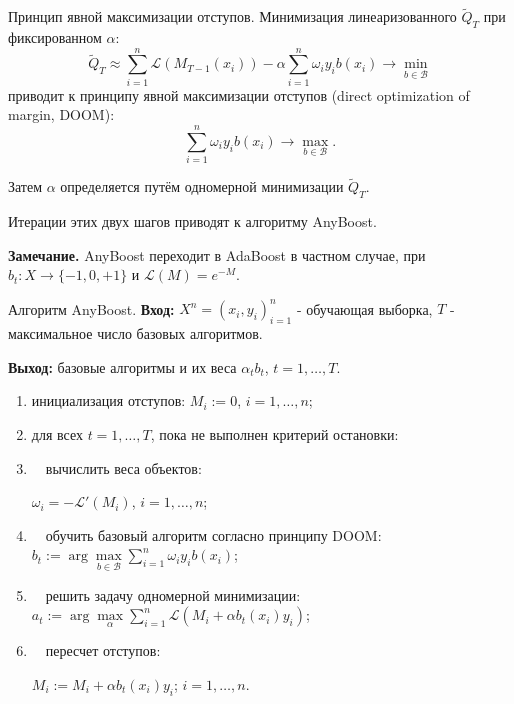 \documentclass[10pt,unicode,notheorems]{beamer}
\newcommand{\Laplace}{\mathscr{L}}
\begin{document}
\begin{frame}{Принцип явной максимизации отступов.}
Минимизация линеаризованного $\widetilde {Q}_T$ при фиксированном $\alpha$:
$$\widetilde {Q}_T \approx \sum_{i=1}^{n} \Laplace (M_{T-1}(x_i)) - \alpha \sum_{i=1}^{n} \omega_i y_i b(x_i) \to \min \limits_{b \in \mathcal{B}}$$
приводит к принципу явной максимизации отступов (direct optimization of margin, DOOM):
$$\sum_{i=1}^{n} \omega_i y_i b(x_i) \to \max \limits_{b \in \mathcal{B}}.$$

Затем $\alpha$ определяется путём одномерной минимизации $\widetilde {Q}_T$.
\vspace{0.2cm}

Итерации этих двух шагов приводят к алгоритму AnyBoost.
\vspace{0.2cm}

\textbf{Замечание.} AnyBoost переходит в AdaBoost в частном случае,
при $b_t: X \to \{-1, 0, +1\}$ и $\Laplace (M) = e^{-M}$.
\end{frame}

\begin{frame}{Алгоритм AnyBoost.}
\textbf{Вход:} $X^n = (x_i,y_i)_{i=1}^n$ - обучающая выборка, $T$ - максимальное число базовых алгоритмов.
\vspace{0.2cm}

\textbf{Выход:} базовые алгоритмы и их веса $\alpha_t b_t$, $t = 1, \ldots, T$.
\vspace{0.2cm}

\begin{enumerate}
\item инициализация отступов: $M_i := 0$, $i = 1, \ldots, n$;
\item для всех $t=1,\ldots,T$, пока не выполнен критерий остановки:
\item  $\quad$вычислить веса объектов:

$\omega_i = -\Laplace'(M_i)$, $i = 1, \ldots, n$;
\item   $\quad$обучить базовый алгоритм согласно принципу DOOM: 
$b_t := \arg \max \limits_{b \in \mathcal{B}} \sum_{i=1}^{n} \omega_i y_i b(x_i)$;
\item   $\quad$решить задачу одномерной минимизации:
$a_t := \arg \max \limits_{\alpha} \sum_{i=1}^{n} \Laplace(M_i+\alpha b_t(x_i) y_i)$;
\item   $\quad$пересчет отступов: 

$M_i := M_i +\alpha b_t(x_i) y_i$; $i = 1, \ldots, n$.
\end{enumerate}
    
\end{frame}
\end{document}
